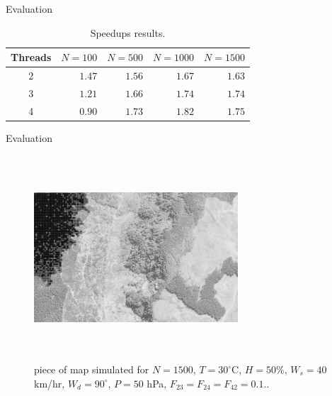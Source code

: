 \documentclass{beamer}
\begin{document}
      \begin{frame}{Evaluation}
        \begin{table}[!ht]
        \renewcommand{\arraystretch}{1.3}
        \centering
        \caption{Speedups results.}
        \label{tab:speedups}
        \begin{tabular}{c||rrrr}
          \hline
          Threads & $N=100$ & $N=500$ & $N=1000$ & $N=1500$ \\ \hline\hline
          2       & $1.47$ & $1.56$ & $1.67$ & $1.63$ \\
          3       & $1.21$ & $1.66$ & $1.74$ & $1.74$ \\
          4       & $0.90$ & $1.73$ & $1.82$ & $1.75$  
          \end{tabular}
        \end{table}
      \end{frame}
      
      \begin{frame}{Evaluation}
        \begin{figure}[!ht]
          \centering
          \includegraphics[width=3in,height=3in,clip,keepaspectratio]{figures/simulation_gray.png}
          \caption{piece of map simulated for $N=1500$, $T=30^{\circ}$C, $H=50$\%, 
              $W_s=40$ km/hr, $W_d=90^{\circ}$, $P=50$ hPa, $F_{23} = F_{24}= F_{42} = 0.1$..}
          \label{fig:simulation}
        \end{figure}
      \end{frame}
\end{document}

